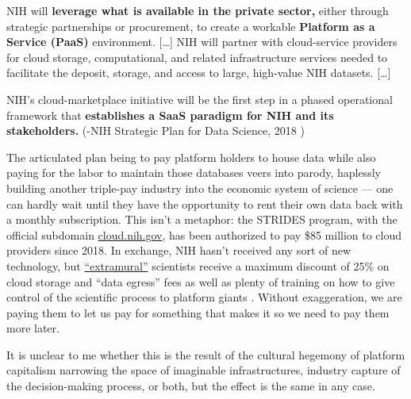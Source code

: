 \begin{leftbar}
NIH will \textbf{leverage what is available in the private sector,}
either through strategic partnerships or procurement, to create a
workable \textbf{Platform as a Service (PaaS)} environment. {[}\ldots{]}
NIH will partner with cloud-service providers for cloud storage,
computational, and related infrastructure services needed to facilitate
the deposit, storage, and access to large, high-value NIH datasets.
{[}\ldots{]}

NIH's cloud-marketplace initiative will be the first step in a phased
operational framework that \textbf{establishes a SaaS paradigm for NIH
and its stakeholders.} (-NIH Strategic Plan for Data Science, 2018 \citep{NIHStrategicPlan2018} )
\end{leftbar}

The articulated plan being to pay platform holders to house data while
also paying for the labor to maintain those databases veers into parody,
haplessly building another triple-pay industry \citep{buranyiStaggeringlyProfitableBusiness2017}  into the economic system
of science --- one can hardly wait until they have the opportunity to
rent their own data back with a monthly subscription. This isn't a
metaphor: the STRIDES program, with the official subdomain
\href{https://web.archive.org/web/20210729131920/https://cloud.nih.gov/}{cloud.nih.gov},
has been authorized to pay \$85 million to cloud providers since 2018.
In exchange, NIH hasn't received any sort of new technology, but
\href{https://web.archive.org/web/20211006003547/https://cloud.nih.gov/enrollment/account-type/}{``extramural''}
scientists receive a maximum discount of 25\% on cloud storage and
``data egress'' fees as well as plenty of training on how to give
control of the scientific process to platform giants \citep{reillyNIHSTRIDESInitiative2021} . Without
exaggeration, we are paying them to let us pay for something that makes
it so we need to pay them more later.

It is unclear to me whether this is the result of the cultural hegemony
of platform capitalism narrowing the space of imaginable
infrastructures, industry capture of the decision-making process, or
both, but the effect is the same in any case.


